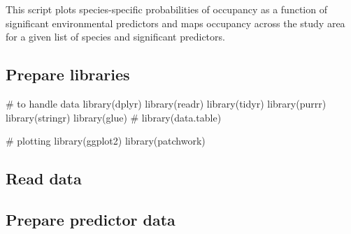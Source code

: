 \documentclass[
]{article}
\newenvironment{Shaded}{}{}
\newcommand{\CommentTok}[1]{\textcolor[rgb]{0.00,0.50,0.00}{#1}}
\newcommand{\DataTypeTok}[1]{#1}
\newcommand{\KeywordTok}[1]{\textcolor[rgb]{0.00,0.00,1.00}{#1}}
\newcommand{\NormalTok}[1]{#1}
\newcommand{\OperatorTok}[1]{#1}
\newcommand{\StringTok}[1]{\textcolor[rgb]{0.00,0.50,0.50}{#1}}
\begin{document}
This script plots species-specific probabilities of occupancy as a function of significant environmental predictors and maps occupancy across the study area for a given list of species and significant predictors.

\hypertarget{prepare-libraries-5}{%
\subsection{Prepare libraries}\label{prepare-libraries-5}}

\begin{Shaded}
\begin{Highlighting}[]
\CommentTok{# to handle data}
\KeywordTok{library}\NormalTok{(dplyr)}
\KeywordTok{library}\NormalTok{(readr)}
\KeywordTok{library}\NormalTok{(tidyr)}
\KeywordTok{library}\NormalTok{(purrr)}
\KeywordTok{library}\NormalTok{(stringr)}
\KeywordTok{library}\NormalTok{(glue)}
\CommentTok{# library(data.table)}

\CommentTok{# plotting}
\KeywordTok{library}\NormalTok{(ggplot2)}
\KeywordTok{library}\NormalTok{(patchwork)}
\end{Highlighting}
\end{Shaded}

\hypertarget{read-data}{%
\subsection{Read data}\label{read-data}}

\begin{Shaded}
\end{Shaded}

\hypertarget{prepare-predictor-data}{%
\subsection{Prepare predictor data}\label{prepare-predictor-data}}
\end{document}
